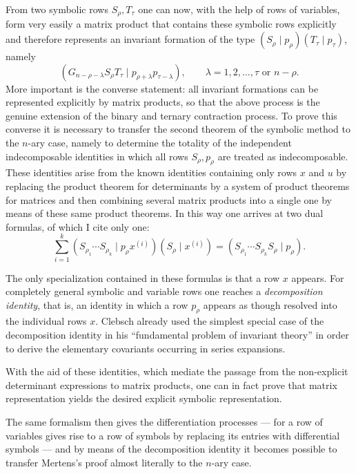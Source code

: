 \documentclass[11pt]{article}
\begin{document}
From two symbolic rows $S_\rho,T_\tau$ one can now, with the help of rows of variables, form very easily a matrix product that contains these symbolic rows explicitly and therefore represents an invariant formation of the type $(S_\rho\mid p_\rho)(T_\tau\mid p_\tau)$, namely
\[
(G_{n-\rho-\lambda}S_\rho T_\tau \mid p_{\rho+\lambda}p_{\tau-\lambda}),
\qquad
\lambda = 1,2,\dots,\tau \text{ or } n-\rho.
\tag{1}
\]
More important is the converse statement: all invariant formations can be represented explicitly by matrix products, so that the above process is the genuine extension of the binary and ternary contraction process. To prove this converse it is necessary to transfer the second theorem of the symbolic method to the $n$-ary case, namely to determine the totality of the independent indecomposable identities in which all rows $S_\rho,p_\rho$ are treated as indecomposable. These identities arise from the known identities containing only rows $x$ and $u$ by replacing the product theorem for determinants by a system of product theorems for matrices and then combining several matrix products into a single one by means of these same product theorems. In this way one arrives at two dual formulas, of which I cite only one:
\[
\sum_{i=1}^{k} (S_{\rho_1}\cdots S_{\rho_k}\mid p_\rho x^{(i)})(S_\rho\mid x^{(i)})
=
(S_{\rho_1}\cdots S_{\rho_k}S_\rho\mid p_\rho).
\tag{2}
\]

The only specialization contained in these formulas is that a row $x$ appears. For completely general symbolic and variable rows one reaches a \emph{decomposition identity}, that is, an identity in which a row $p_\rho$ appears as though resolved into the individual rows $x$. Clebsch already used the simplest special case of the decomposition identity in his ``fundamental problem of invariant theory'' in order to derive the elementary covariants occurring in series expansions.

With the aid of these identities, which mediate the passage from the non-explicit determinant expressions to matrix products, one can in fact prove that matrix representation yields the desired explicit symbolic representation.

The same formalism then gives the differentiation processes --- for a row of variables gives rise to a row of symbols by replacing its entries with differential symbols --- and by means of the decomposition identity it becomes possible to transfer Mertens's proof almost literally to the $n$-ary case.

\clearpage
\end{document}

